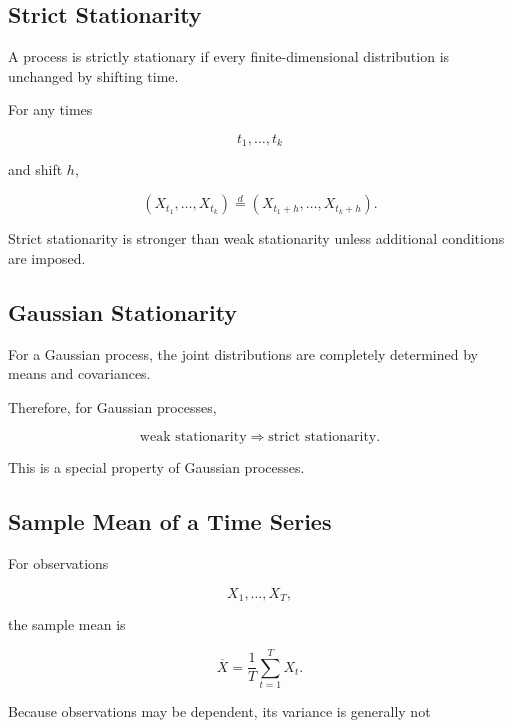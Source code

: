 \subsection{Strict Stationarity}
\label{subsec:strict-stationarity}

A process is strictly stationary if every finite-dimensional
distribution is unchanged by shifting time.

For any times

\[
t_1,\ldots,t_k
\]

and shift \(h\),

\[
\boxed{
(
X_{t_1},
\ldots,
X_{t_k}
)
\overset{d}{=}
(
X_{t_1+h},
\ldots,
X_{t_k+h}
).
}
\]

Strict stationarity is stronger than weak stationarity unless additional
conditions are imposed.

\subsection{Gaussian Stationarity}
\label{subsec:gaussian-stationarity}

For a Gaussian process, the joint distributions are completely
determined by means and covariances.

Therefore, for Gaussian processes,

\[
\boxed{
\text{weak stationarity}
\Longrightarrow
\text{strict stationarity}.
}
\]

This is a special property of Gaussian processes.

\subsection{Sample Mean of a Time Series}
\label{subsec:time-series-sample-mean}

For observations

\[
X_1,\ldots,X_T,
\]

the sample mean is

\[
\boxed{
\overline{X}
=
\frac1T
\sum_{t=1}^{T}
X_t.
}
\]

Because observations may be dependent, its variance is generally not

